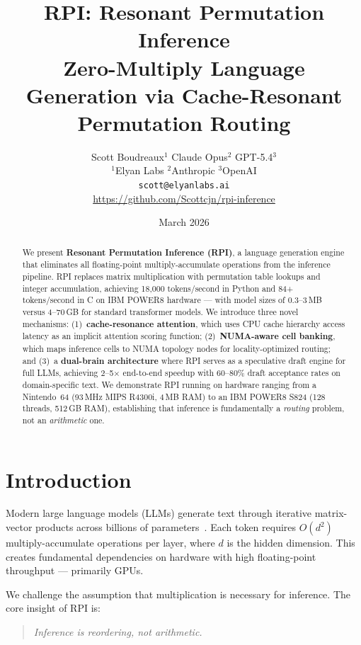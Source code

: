 \documentclass[10pt,twocolumn]{article}
\title{\textbf{RPI: Resonant Permutation Inference}\\
\large Zero-Multiply Language Generation via Cache-Resonant Permutation Routing}
\author{
Scott Boudreaux$^{1}$ \quad Claude Opus$^{2}$ \quad GPT-5.4$^{3}$ \\
$^{1}$Elyan Labs \quad $^{2}$Anthropic \quad $^{3}$OpenAI \\
\texttt{scott@elyanlabs.ai} \\
\url{https://github.com/Scottcjn/rpi-inference}
}
\date{March 2026}
\begin{document}
\maketitle

\begin{abstract}
We present \textbf{Resonant Permutation Inference (RPI)}, a language generation engine that eliminates all floating-point multiply-accumulate operations from the inference pipeline. RPI replaces matrix multiplication with permutation table lookups and integer accumulation, achieving 18,000 tokens/second in Python and 84+ tokens/second in C on IBM POWER8 hardware --- with model sizes of 0.3--3\,MB versus 4--70\,GB for standard transformer models. We introduce three novel mechanisms: (1)~\textbf{cache-resonance attention}, which uses CPU cache hierarchy access latency as an implicit attention scoring function; (2)~\textbf{NUMA-aware cell banking}, which maps inference cells to NUMA topology nodes for locality-optimized routing; and (3)~a \textbf{dual-brain architecture} where RPI serves as a speculative draft engine for full LLMs, achieving 2--5$\times$ end-to-end speedup with 60--80\% draft acceptance rates on domain-specific text. We demonstrate RPI running on hardware ranging from a Nintendo~64 (93\,MHz MIPS R4300i, 4\,MB RAM) to an IBM POWER8 S824 (128 threads, 512\,GB RAM), establishing that inference is fundamentally a \emph{routing} problem, not an \emph{arithmetic} one.
\end{abstract}

\section{Introduction}
\label{sec:intro}

Modern large language models (LLMs) generate text through iterative matrix-vector products across billions of parameters~\cite{vaswani2017attention, touvron2023llama}. Each token requires $O(d^2)$ multiply-accumulate operations per layer, where $d$ is the hidden dimension. This creates fundamental dependencies on hardware with high floating-point throughput --- primarily GPUs.

We challenge the assumption that multiplication is necessary for inference. The core insight of RPI is:

\begin{quote}
\emph{Inference is reordering, not arithmetic.}
\end{quote}
\end{document}
